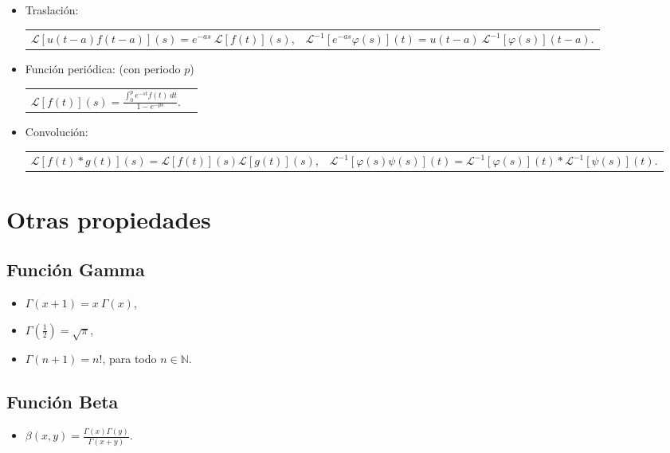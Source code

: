 \documentclass[a4,10pt,comentarios]{aleph-notas}
\newcommand{\lap}[2][s]{\displaystyle \mathscr{L} \left[#2\right](#1)}
\newcommand{\lapi}[2][t]{\displaystyle \mathscr{L}^{-1} \left[#2\right](#1)}
\newcommand{\Gam}[1]{\displaystyle\Gamma\left(#1\right)}
\newcommand{\intd}[4]{\displaystyle\int^{#2}_{#1} #3\ d#4}
\begin{document}
\begin{itemize}[leftmargin=*]
\item {Traslación:}
    \begin{center}
    \begin{tabular}{@{}p{7.2cm}p{8.6cm}@{}}
       $\lap{u(t-a)f(t-a)}=e^{-as}\ \lap{f(t)}$,
       &
       $\lapi{e^{-as}\varphi(s)}=u(t-a)\ \lapi[t-a]{\varphi(s)}$.
    \end{tabular}
    \end{center}
\item {Función periódica:} (con periodo $p$)
    \begin{center}
    \begin{tabular}{@{}p{7.2cm}p{8.6cm}@{}}
       $\lap{f(t)}=\frac{\intd{0}{p}{e^{-st}f(t)}{t}}{1-e^{-ps}}$.
       &
    \end{tabular}
    \end{center}
\item {Convolución:}
    \begin{center}
    \begin{tabular}{@{}p{7.2cm}p{8.6cm}@{}}
       $\lap{f(t)\ast g(t)}=\lap{f(t)}\lap{g(t)}$,
       &
       $\lapi{\varphi(s)\psi(s)}=\lapi{\varphi(s)}\ast \lapi{\psi(s)}$.
    \end{tabular}
    \end{center}
\end{itemize}


\section{Otras propiedades}
\subsection{Función Gamma}
\begin{itemize}[leftmargin=*]
\item $\Gam{x+1}=x\ \Gam{x}$,
\item $\Gam{\frac{1}{2}}=\sqrt{\pi}$,
\item $\Gam{n+1}=n!$, para todo $n\in \mathbb{N}$.
\end{itemize}

\subsection{Función Beta}
\begin{itemize}[leftmargin=*]
\item $\displaystyle\beta(x,y)=\frac{\Gam{x}\Gam{y}}{\Gam{x+y}}$.
\end{itemize}
\end{document}
